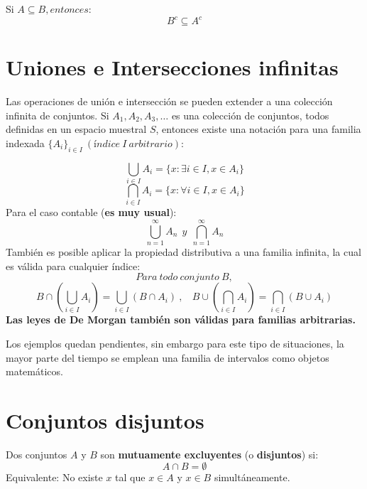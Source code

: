 \documentclass[
  letterpaper,
  DIV=11,
  numbers=noendperiod]{scrreprt}
\begin{document}
\begin{tcolorbox}[enhanced jigsaw, arc=.35mm, bottomrule=.15mm, bottomtitle=1mm, breakable, colback=white, colbacktitle=quarto-callout-note-color!10!white, colframe=quarto-callout-note-color-frame, coltitle=black, left=2mm, leftrule=.75mm, opacityback=0, opacitybacktitle=0.6, rightrule=.15mm, title={Subconjunto de complementos}, titlerule=0mm, toprule=.15mm, toptitle=1mm]

Si \(A \subseteq B, entonces:\) \[
B^c \subseteq A^c
\]

\end{tcolorbox}

\section{Uniones e Intersecciones
infinitas}\label{uniones-e-intersecciones-infinitas}

Las operaciones de unión e intersección se pueden extender a una
colección infinita de conjuntos. Si \(A_1, A_2, A_3, \ldots\) es una
colección de conjuntos, todos definidas en un espacio muestral \(S\),
entonces existe una notación para una familia indexada
\(\{A_i\}_{i \in I} \ (índice \ I \ arbitrario):\)

\[
\bigcup_{i \in I}A_i = \{ x: \exists i \in I, x \in A_i \}
\] \[
\bigcap_{i \in I}A_i = \{ x: \forall  i \in I, x \in A_i \}
\] Para el caso contable (\textbf{es muy usual}): \[
\bigcup_{n=1}^{\infty} A_n \  \ y \ \ \bigcap_{n=1}^{\infty}A_n
\] También es posible aplicar la propiedad distributiva a una familia
infinita, la cual es válida para cualquier índice:\\
\[
Para \ todo \ conjunto \ B,
\] \[
B \cap(\bigcup_{i \in I} A_i) = \bigcup_{i \in I}(B \cap A_i) \ , \ \ \ \  B \cup(\bigcap_{i \in I} A_i) = \bigcap_{i \in I}(B \cup A_i)
\] \textbf{Las leyes de De Morgan también son válidas para familias
arbitrarias.}

Los ejemplos quedan pendientes, sin embargo para este tipo de
situaciones, la mayor parte del tiempo se emplean una familia de
intervalos como objetos matemáticos.

\section{Conjuntos disjuntos}\label{conjuntos-disjuntos}

\begin{tcolorbox}[enhanced jigsaw, arc=.35mm, bottomrule=.15mm, bottomtitle=1mm, breakable, colback=white, colbacktitle=quarto-callout-caution-color!10!white, colframe=quarto-callout-caution-color-frame, coltitle=black, left=2mm, leftrule=.75mm, opacityback=0, opacitybacktitle=0.6, rightrule=.15mm, title={Definición}, titlerule=0mm, toprule=.15mm, toptitle=1mm]

Dos conjuntos \(A\) y \(B\) son \textbf{mutuamente excluyentes} (o
\textbf{disjuntos}) si:\\
\[
A \cap B = \emptyset
\] Equivalente: No existe \(x\) tal que \(x \in A\) y \(x \in B\)
simultáneamente.

\end{tcolorbox}
\end{document}
